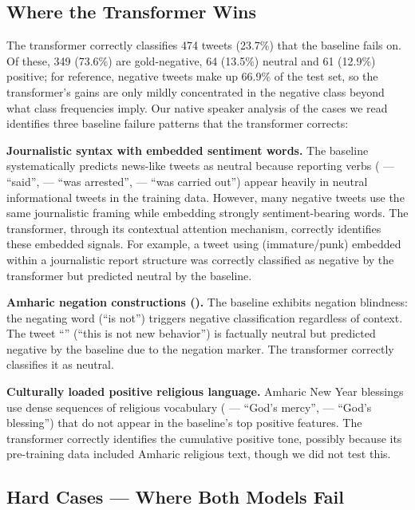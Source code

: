 \subsection{Where the Transformer Wins}

The transformer correctly classifies 474 tweets (23.7\%) that the baseline fails on. Of these, 349 (73.6\%) are gold-negative, 64 (13.5\%) neutral and 61 (12.9\%) positive; for reference, negative tweets make up 66.9\% of the test set, so the transformer's gains are only mildly concentrated in the negative class beyond what class frequencies imply. Our native speaker analysis of the cases we read identifies three baseline failure patterns that the transformer corrects:

\textbf{Journalistic syntax with embedded sentiment words.} The baseline systematically predicts news-like tweets as neutral because reporting verbs ( --- ``said'',  --- ``was arrested'',  --- ``was carried out'') appear heavily in neutral informational tweets in the training data. However, many negative tweets use the same journalistic framing while embedding strongly sentiment-bearing words. The transformer, through its contextual attention mechanism, correctly identifies these embedded signals. For example, a tweet using  (immature/punk) embedded within a journalistic report structure was correctly classified as negative by the transformer but predicted neutral by the baseline.

\textbf{Amharic negation constructions ().} The baseline exhibits negation blindness: the negating word  (``is not'') triggers negative classification regardless of context. The tweet ``'' (``this is not new behavior'') is factually neutral but predicted negative by the baseline due to the negation marker. The transformer correctly classifies it as neutral.

\textbf{Culturally loaded positive religious language.} Amharic New Year blessings use dense sequences of religious vocabulary ( --- ``God's mercy'',  --- ``God's blessing'') that do not appear in the baseline's top positive features. The transformer correctly identifies the cumulative positive tone, possibly because its pre-training data included Amharic religious text, though we did not test this.

\subsection{Hard Cases --- Where Both Models Fail}

